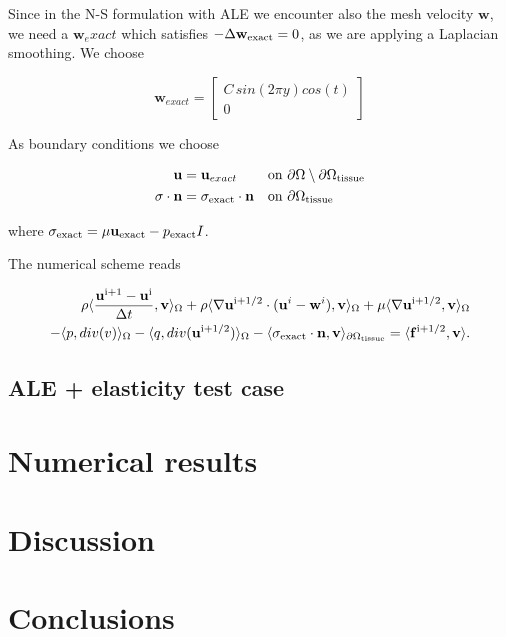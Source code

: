 \documentclass[11pt,a4paper,titlepage]{report}
\begin{document}
Since in the N-S formulation with ALE we encounter also the mesh velocity $\mathbf{w}$, we need a $\mathbf{w}_exact$ which satisfies $- \Delta \mathbf{w}_{\rm exact} = 0$, as we are applying a Laplacian smoothing. We choose

\begin{equation}
\mathbf{w}_{exact} = \left[ \begin{array}{c} C \, sin(2 \pi y) cos(t) \\
0 \end{array} \right]
\end{equation}

As boundary conditions we choose

\begin{align}
\mathbf{u} &= \mathbf{u}_{exact} &&\text{on } \partial \Omega \setminus  \partial \Omega_{\rm tissue} \\
\sigma \cdot \mathbf{n} &= \sigma_{\rm exact} \cdot \mathbf{n} &&\text{on }  \partial \Omega_{\rm tissue}
\end{align}

where $\sigma_{\rm exact} = \mu \mathbf{u}_{\rm exact} - p_{\rm exact}I$.

The numerical scheme reads

\begin{equation}
\begin{split}
\rho \langle \frac{\mathbf{u}^{\rm i+1} - \mathbf{u}^{\rm i}}{\Delta t}, \mathbf{v} \rangle_\Omega
+ \rho \langle \nabla \mathbf{u}^{\rm i+ 1/2} \cdot (\mathbf{u}^i - \mathbf{w}^i), \mathbf{v} \rangle_\Omega
+ \mu \langle \nabla \mathbf{u}^{\rm i + 1/2} , \mathbf{v} \rangle_\Omega \\
- \langle p, div(v) \rangle_\Omega 
- \langle q, div(\mathbf{u}^{\rm i+1/2}) \rangle_\Omega
- \langle \sigma_{\rm exact} \cdot \mathbf{n}, \mathbf{v} \rangle_{\partial \Omega_{\rm tissue}} = \langle \mathbf{f}^{\rm i+1/2}, \mathbf{v} \rangle.
\end{split}
\end{equation}

\section{ALE + elasticity test case}

\chapter{Numerical results}

\chapter{Discussion}

\chapter{Conclusions}
\end{document}
